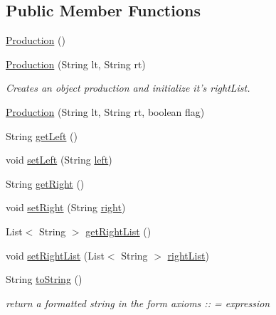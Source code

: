 \subsection*{Public Member Functions}
\begin{DoxyCompactItemize}
\item 
\hyperlink{classcontext_free_1_1grammar_1_1_production_a266aff6e67d35263dc262ea413eabefe}{Production} ()
\item 
\hyperlink{classcontext_free_1_1grammar_1_1_production_a1db3c4e260abdcac50a8425cc9bd901f}{Production} (String lt, String rt)
\begin{DoxyCompactList}\small\item\em Creates an object production and initialize it's right\-List. \end{DoxyCompactList}\item 
\hyperlink{classcontext_free_1_1grammar_1_1_production_abc6df7181791245b8c3bf38871bc38b8}{Production} (String lt, String rt, boolean flag)
\item 
String \hyperlink{classcontext_free_1_1grammar_1_1_production_a6b42819c4b8af1aa759edf3ad5978f67}{get\-Left} ()
\item 
void \hyperlink{classcontext_free_1_1grammar_1_1_production_a6a9e81d7a3445993afd077cfc4d21a12}{set\-Left} (String \hyperlink{classcontext_free_1_1grammar_1_1_production_ad188a705cd57d55d32fd198e6af71f75}{left})
\item 
String \hyperlink{classcontext_free_1_1grammar_1_1_production_a0b6496bc60eefe88fd4652a6f01ec15e}{get\-Right} ()
\item 
void \hyperlink{classcontext_free_1_1grammar_1_1_production_aa36b86719aaccecb3c90a492c0d766e3}{set\-Right} (String \hyperlink{classcontext_free_1_1grammar_1_1_production_ab72c30da44fb1fbf41b9a70bf799ef58}{right})
\item 
List$<$ String $>$ \hyperlink{classcontext_free_1_1grammar_1_1_production_ae712218305325e3649fa26989db291de}{get\-Right\-List} ()
\item 
void \hyperlink{classcontext_free_1_1grammar_1_1_production_a84c7fa859310c752fa76fb1ecc3fedba}{set\-Right\-List} (List$<$ String $>$ \hyperlink{classcontext_free_1_1grammar_1_1_production_a51394e602f57b3e2f9b07d14fd01adb9}{right\-List})
\item 
String \hyperlink{classcontext_free_1_1grammar_1_1_production_a43d78cd85446efbbffe59a2278c410d1}{to\-String} ()
\begin{DoxyCompactList}\small\item\em return a formatted string in the form axioms \-:\-: = expression \end{DoxyCompactList}\end{DoxyCompactItemize}
